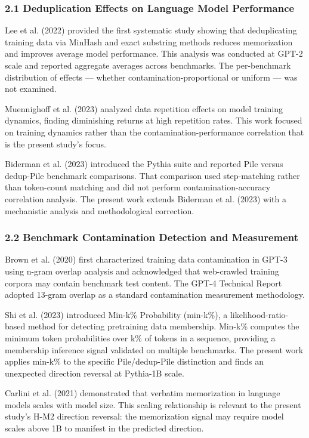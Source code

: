 
\subsubsection{2.1 Deduplication Effects on Language Model Performance}

Lee et al. (2022) provided the first systematic study showing that deduplicating training data via MinHash and exact substring methods reduces memorization and improves average model performance. This analysis was conducted at GPT-2 scale and reported aggregate averages across benchmarks. The per-benchmark distribution of effects --- whether contamination-proportional or uniform --- was not examined.

Muennighoff et al. (2023) analyzed data repetition effects on model training dynamics, finding diminishing returns at high repetition rates. This work focused on training dynamics rather than the contamination-performance correlation that is the present study's focus.

Biderman et al. (2023) introduced the Pythia suite and reported Pile versus dedup-Pile benchmark comparisons. That comparison used step-matching rather than token-count matching and did not perform contamination-accuracy correlation analysis. The present work extends Biderman et al. (2023) with a mechanistic analysis and methodological correction.

\subsubsection{2.2 Benchmark Contamination Detection and Measurement}

Brown et al. (2020) first characterized training data contamination in GPT-3 using n-gram overlap analysis and acknowledged that web-crawled training corpora may contain benchmark test content. The GPT-4 Technical Report adopted 13-gram overlap as a standard contamination measurement methodology.

Shi et al. (2023) introduced Min-k\% Probability (min-k\%), a likelihood-ratio-based method for detecting pretraining data membership. Min-k\% computes the minimum token probabilities over k\% of tokens in a sequence, providing a membership inference signal validated on multiple benchmarks. The present work applies min-k\% to the specific Pile/dedup-Pile distinction and finds an unexpected direction reversal at Pythia-1B scale.

Carlini et al. (2021) demonstrated that verbatim memorization in language models scales with model size. This scaling relationship is relevant to the present study's H-M2 direction reversal: the memorization signal may require model scales above 1B to manifest in the predicted direction.

